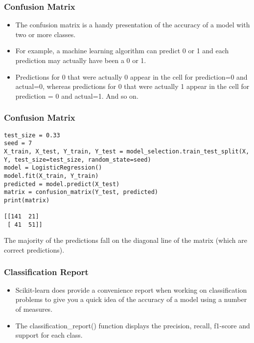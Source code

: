 \begin{frame}[fragile]\frametitle{Confusion Matrix}

	\begin{itemize}
	\item The confusion matrix is a handy presentation of the accuracy of a model with two or more classes.
	\item For example, a machine learning algorithm can predict 0 or 1 and each prediction may actually have been a 0 or 1. 
	\item Predictions for 0 that were actually 0 appear in the cell for prediction=0 and actual=0, whereas predictions for 0 that were actually 1 appear in the cell for prediction = 0 and actual=1. And so on.
	\end{itemize}

\end{frame}

\begin{frame}[fragile]\frametitle{Confusion Matrix}
\begin{lstlisting}
test_size = 0.33
seed = 7
X_train, X_test, Y_train, Y_test = model_selection.train_test_split(X, Y, test_size=test_size, random_state=seed)
model = LogisticRegression()
model.fit(X_train, Y_train)
predicted = model.predict(X_test)
matrix = confusion_matrix(Y_test, predicted)
print(matrix)

[[141  21]
 [ 41  51]]
\end{lstlisting}

The majority of the predictions fall on the diagonal line of the matrix (which are correct predictions).
\end{frame}


\begin{frame}[fragile]\frametitle{Classification Report}

	\begin{itemize}
	\item Scikit-learn does provide a convenience report when working on classification problems to give you a quick idea of the accuracy of a model using a number of measures.
	\item The classification\_report() function displays the precision, recall, f1-score and support for each class.
	\end{itemize}

\end{frame}


